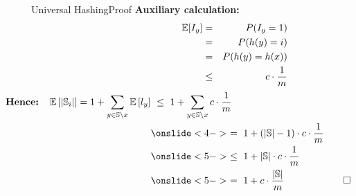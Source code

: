 
\begin{frame}{Universal Hashing}{Proof}
  \textbf{Auxiliary calculation:}
   {\color{MainA}
     \vspace*{-1.7em}
     \begin{eqnarray*}
       \hspace{6em}           
         \mathbb{E}[I_y] & = & P(I_y = 1)\\
         {} & = & P(h(y) = i)\\
         {} & = & P(h(y) = h(x))\\
         {} & \leq &  c \cdot \frac{1}{m}
   \end{eqnarray*}}
   {\color{MainA}
     \vspace{-0.6em}   
     \begin{alignat*}{3}
\hspace*{-2cm} \text{\textbf{Hence:\quad{}}}        \E\left[\vert \mathbb{S}_i \vert\right]
=1 + \sum_{y \in \mathbb{S} \setminus x}  \E\left[l_y \right]
      &\ \leq\ 1 + \sum_{y \in \mathbb{S} \setminus x} c \cdot \frac{1}{m}\\
     &\onslide<4->\ =\ 1 + \left(\vert \mathbb{S}  \vert - 1\right) \cdot c \cdot \frac{1}{m}\\
     &\onslide<5->\ \leq\ \displaystyle 1 + \vert \mathbb{S} \vert \cdot c \cdot \frac{1}{m}\\
&\onslide<5->\ =\  1 + c \cdot \frac{\vert \mathbb{S} \vert}{m}
&\quad\square
     \end{alignat*}
}
\end{frame}

